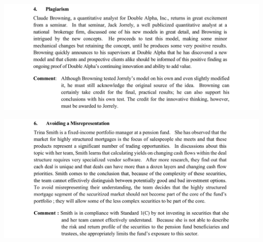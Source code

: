 \documentclass[
  a4paper,
  DIV=11,
  numbers=noendperiod]{scrreprt}
\begin{document}
\includegraphics{image/ethic3.png}

\includegraphics{image/ethic4.png}
\end{document}
